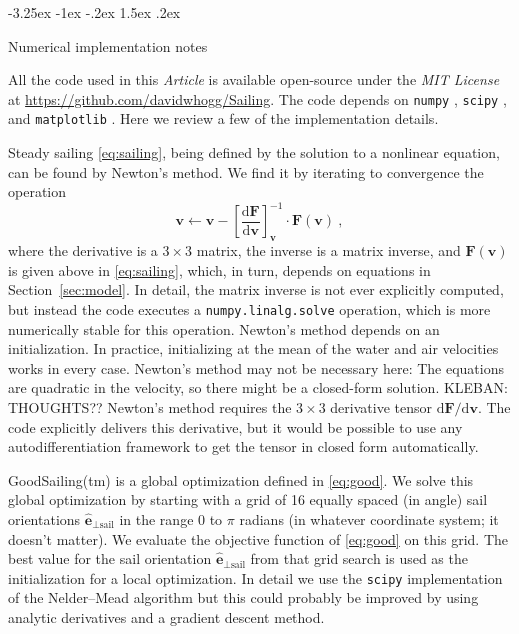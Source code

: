 \documentclass[letterpaper]{article}
\makeatletter
\newcommand{\dd}{\mathrm{d}}
\renewcommand{\vec}[1]{\boldsymbol{#1}}
\newcommand{\uvec}{\vec{\hat{e}}}
\newcommand{\sail}{\text{sail}}
\newcommand{\documentname}{\textsl{Article}}
\newcommand{\secref}[1]{Section~\ref{#1}}
\newcommand{\code}[1]{\texttt{#1}}
\renewcommand\section{\@startsection {section}{1}{\z@}%
  {-3.25ex \@plus -1ex \@minus -.2ex}%
  {1.5ex \@plus .2ex}%
  {\raggedright\normalfont\large\bfseries}}
\makeatother
\begin{document}
\section{Numerical implementation notes}\label{sec:implementation}

All the code used in this \documentname{} is available open-source under the \textsl{MIT License} at \url{https://github.com/davidwhogg/Sailing}.
The code depends on \code{numpy} \cite{numpy}, \code{scipy} \cite{scipy}, and \code{matplotlib} \cite{matplotlib}.
Here we review a few of the implementation details.

Steady sailing \eqref{eq:sailing}, being defined by the solution to a nonlinear equation, can be found by Newton's method.
We find it by iterating to convergence the operation
\begin{equation}
    \vec{v} \leftarrow \vec{v} - \left[\frac{\dd \vec{F}}{\dd \vec{v}}\right]_{\vec{v}}^{-1}\cdot \vec{F}(\vec{v}) ~,
\end{equation}
where the derivative is a $3\times 3$ matrix, the inverse is a matrix inverse, and $\vec{F}(\vec{v})$ is given above in \eqref{eq:sailing}, which, in turn, depends on equations in \secref{sec:model}.
In detail, the matrix inverse is not ever explicitly computed, but instead the code executes a \code{numpy.linalg.solve} \cite{numpy} operation, which is more numerically stable for this operation.
Newton's method depends on an initialization.
In practice, initializing at the mean of the water and air velocities works in every case.
Newton's method may not be necessary here: The equations are quadratic in the velocity, so there might be a closed-form solution. KLEBAN: THOUGHTS??
Newton's method requires the $3\times 3$ derivative tensor $\dd\vec{F}/\dd\vec{v}$.
The code explicitly delivers this derivative, but it would be possible to use any autodifferentiation framework to get the tensor in closed form automatically.

GoodSailing(tm) is a global optimization defined in \eqref{eq:good}.
We solve this global optimization by starting with a grid of 16 equally spaced (in angle) sail orientations $\uvec_{\perp\sail}$ in the range 0 to $\pi$ radians (in whatever coordinate system; it doesn't matter).
We evaluate the objective function of \eqref{eq:good} on this grid.
The best value for the sail orientation $\uvec_{\perp\sail}$ from that grid search is used as the initialization for a local optimization.
In detail we use the \code{scipy} \cite{scipy} implementation of the Nelder--Mead algorithm \cite{nelder-mead} but this could probably be improved by using analytic derivatives and a gradient descent method.
\end{document}

